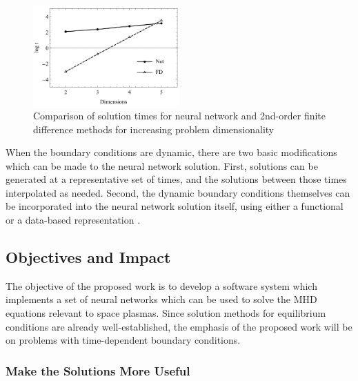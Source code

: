 \documentclass{article}
\begin{document}
\begin{figure}
  \centering
  \includegraphics[width=0.5\textwidth]{Avrutskiy_2017.png}
  \caption{Comparison of solution times for neural network and 2nd-order finite difference methods for increasing problem dimensionality \cite{Avrutskiy2017}}
  \label{fig:Avrutskiy_2017}
\end{figure}

When the boundary conditions are dynamic, there are two basic modifications which can be made to the neural network solution. First, solutions can be generated at a representative set of times, and the solutions between those times interpolated as needed. Second, the dynamic boundary conditions themselves can be incorporated into the neural network solution itself, using either a functional or a data-based representation \cite{Lagaris1998}.

\subsection{Objectives and Impact}

The objective of the proposed work is to develop a software system which implements a set of neural networks which can be used to solve the MHD equations relevant to space plasmas. Since solution methods for equilibrium conditions are already well-established, the emphasis of the proposed work will be on problems with time-dependent boundary conditions.

\subsubsection{Make the Solutions More Useful}
\end{document}
